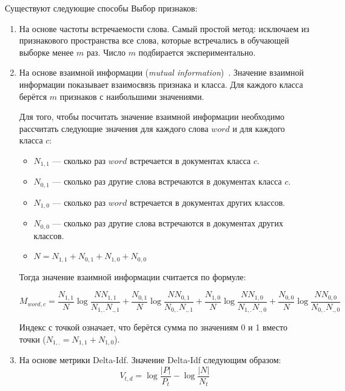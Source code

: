 Существуют следующие способы Выбор признаков:
\begin{enumerate}

\item
На основе частоты встречаемости слова. Самый простой метод: исключаем
из признакового пространства все слова, которые встречались в обучающей
выборке менее $m$ раз. Число $m$ подбирается экспериментально.

\item
На основе взаимной информации (\textit{mutual information})~\cite{mutualinformation}.
Значение взаимной информации показывает взаимосвязь признака
и класса. Для каждого класса берётся $m$ признаков с наибольшими значениями.

Для того, чтобы посчитать значение взаимной информации необходимо рассчитать
следующие значения для каждого слова $word$ и для каждого класса $c$:
\begin{itemize}

\item $N_{1,1}$ --- сколько раз $word$ встречается в документах класса $c$.

\item $N_{0,1}$ --- сколько раз другие слова встречаются в документах класса $c$.

\item $N_{1,0}$ --- сколько раз $word$ встречается в документах других классов.

\item $N_{0,0}$ --- сколько раз другие слова встречаются в документах других классов.

\item $N = N_{1,1} + N_{0,1} + N_{1,0} + N_{0,0}$

\end{itemize}

Тогда значение взаимной информации считается по формуле:

\begin{equation}
M_{word, c} = 
\frac{N_{1,1}}{N} \log \frac{N N_{1,1}} {N_{1,.} N_{.,1}} +
\frac{N_{0,1}}{N} \log \frac{N N_{0,1}} {N_{0,.} N_{.,1}} +
\frac{N_{1,0}}{N} \log \frac{N N_{1,0}} {N_{1,.} N_{.,0}} +
\frac{N_{0,0}}{N} \log \frac{N N_{0,0}} {N_{0,.} N_{.,0}}
\end{equation}

Индекс с точкой означает, что берётся сумма по значениям 0 и 1 вместо точки 
($N_{1, .} = N_{1, 1} + N_{1, 0}$).

\item
На основе метрики Delta-Idf. Значение Delta-Idf следующим образом:
\begin{equation}
V_{t, d} = \log \frac{|P|}{P_t} - \log \frac{|N|}{N_t}
\end{equation}


\end{enumerate}
